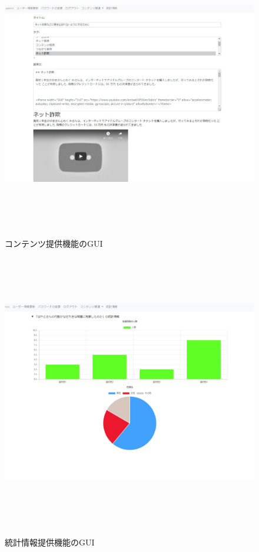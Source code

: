 \begin{figure}[htbp]
    \begin{center}
        \includegraphics[width=13cm,height=12cm,keepaspectratio]{create_content-crop.pdf}\\
    \end{center}
    \caption{コンテンツ提供機能のGUI}
    \label{teikyou}
\end{figure}

\begin{figure}[htbp]
    \begin{center}
        \includegraphics[width=13cm,height=12cm,keepaspectratio]{toukei-crop.pdf}\\
    \end{center}
    \caption{統計情報提供機能のGUI}
    \label{toukei}
\end{figure}


